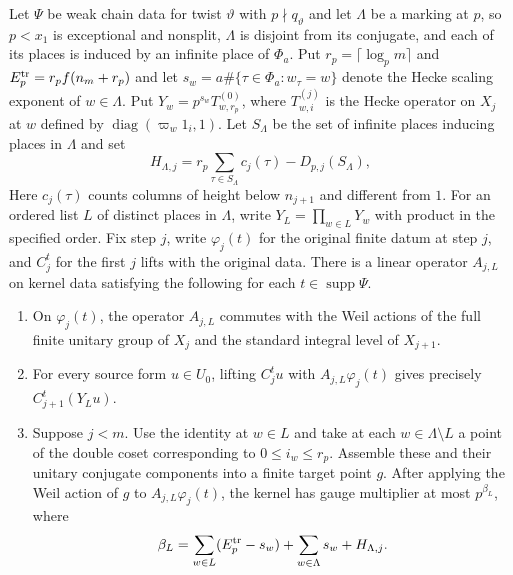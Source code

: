 \begin{lemma}
\label{lem:a-marked-hecke-datum-transfer}
\emitthmsource
Let $\Psi$ be weak chain data for twist $\vartheta$ with $p\nmid q_\vartheta$ and let $\Lambda$ be a marking at $p$, so $p<x_1$ is exceptional and nonsplit, $\Lambda$ is disjoint from its conjugate, and each of its places is induced by an infinite place of $\Phi_a$. Put $r_p=\lceil\log_p m\rceil$ and $E_p^{\rm tr}=r_p f(n_m+r_p)$ and let $s_w=a\#\{\tau\in\Phi_a:w_\tau=w\}$ denote the Hecke scaling exponent of $w\in\Lambda$. Put $Y_w=p^{s_w}T_{w,r_p}^{(0)}$, where $T_{w,i}^{(j)}$ is the Hecke operator on $X_j$ at $w$ defined by $\operatorname{diag}(\varpi_w1_i,1)$. Let $S_\Lambda$ be the set of infinite places inducing places in $\Lambda$ and set
\[
 H_{\Lambda,j}
   =r_p\sum_{\tau\in S_\Lambda}c_j(\tau)-D_{p,j}(S_\Lambda),
\]
Here $c_j(\tau)$ counts columns of height below $n_{j+1}$ and different from $1$. For an ordered list $L$ of distinct places in $\Lambda$, write $Y_L=\prod_{w\in L}Y_w$ with product in the specified order. Fix step $j$, write $\varphi_j(t)$ for the original finite datum at step $j$, and $C_j^t$ for the first $j$ lifts with the original data. There is a linear operator $A_{j,L}$ on kernel data satisfying the following for each $t\in\operatorname{supp}\Psi$.
\begin{enumerate}
\item On $\varphi_j(t)$, the operator $A_{j,L}$ commutes with the Weil actions of the full finite unitary group of $X_j$ and the standard integral level of $X_{j+1}$.
\item For every source form $u\in U_0$, lifting $C_j^t u$ with $A_{j,L}\varphi_j(t)$ gives precisely $C_{j+1}^t(Y_Lu)$.
\item Suppose $j<m$. Use the identity at $w\in L$ and take at each $w\in\Lambda\setminus L$ a point of the double coset corresponding to $0\le i_w\le r_p$. Assemble these and their unitary conjugate components into a finite target point $g$. After applying the Weil action of $g$ to $A_{j,L}\varphi_j(t)$, the kernel has gauge multiplier at most $p^{\beta_L}$, where
\[
  \beta_L=\sum_{w\in L}(E_p^{\rm tr}-s_w)
                +\sum_{w\in\Lambda}s_w+H_{\Lambda,j}.
\]
\end{enumerate}
\end{lemma}
